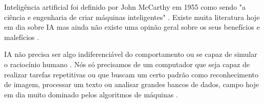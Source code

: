 Inteligência artificial foi definido por John McCarthy em 1955 como sendo "a ciência e engenharia de criar máquinas inteligentes" \cite{hamet2017artificial}. Existe muita literatura hoje em dia sobre IA mas ainda não existe uma opinão geral sobre os seus benefícios e malefícios \cite{hamet2017artificial}.

IA não precisa ser algo indiferenciável do comportamento ou se capaz de simular o raciocínio humano \cite{verganti2020innovation}. Nós só precisamos de um computador que seja capaz de realizar tarefas repetitivas ou que buscam um certo padrão como reconhecimento de imagem, processar um texto ou analisar grandes bancos de dados, campo hoje em dia muito dominado pelos algoritmos de máquinas \cite{verganti2020innovation, chen_artificial_2019}.
